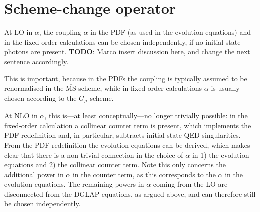 \section{Scheme-change operator}
\label{sec:scheme-change-operator}

At LO in $\alpha$, the coupling $\alpha$ in the PDF (as used in the evolution equations) and in the fixed-order calculations can be chosen independently, if no initial-state photons are present.
\textbf{TODO}: Marco insert discussion here, and change the next sentence accordingly.

This is important, because in the PDFs the coupling is typically assumed to be renormalised in the $\overline{\mathrm{MS}}$ scheme, while in fixed-order calculations $\alpha$ is usually chosen according to the $G_\mu$ scheme.

At NLO in $\alpha$, this is---at least conceptually---no longer trivially possible: in the fixed-order calculation a collinear counter term is present, which implements the PDF redefinition and, in particular, subtracts initial-state QED singularities.
From the PDF redefinition the evolution equations can be derived, which makes clear that there is a non-trivial connection in the choice of $\alpha$ in 1) the evolution equations and 2) the collinear counter term.
Note this only concerns the additional power in $\alpha$ in the counter term, as this corresponds to the $\alpha$ in the evolution equations.
The remaining powers in $\alpha$ coming from the LO are disconnected from the DGLAP equations, as argued above, and can therefore still be chosen independently.

